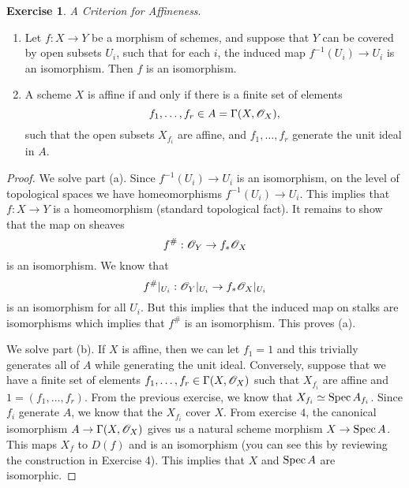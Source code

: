 \documentclass[]{pcmi}
\theoremstyle{plain}
\theoremstyle{definition}
\newtheorem{Exercise}[subsubsection]{Exercise}
\theoremstyle{remark}
\begin{document}
\begin{Exercise}\label{Exercise:2.2.17}
    \emph{A Criterion for Affineness}.
    \begin{enumerate}[label = (\alph*)]
        \item Let $f : X \to Y$ be a morphism of schemes, and suppose that $Y$ can be covered by open subsets $U_i$, such that for each $i$, the induced map $f^{-1}(U_i) \to U_i$ is an isomorphism. Then $f$ is an isomorphism. 
        \item A scheme $X$ is affine if and only if there is a finite set of elements 
        \[
            f_1, \ldots, f_r \in A = \Gamma(X, \mathscr{O}_X),
        \] 
        such that the open subsets $X_{f_i}$ are affine, and $f_1, \ldots, f_r$ generate the unit ideal in $A$. 
    \end{enumerate}
\end{Exercise}

\begin{proof}
    We solve part (a). Since $f^{-1}(U_i) \to U_i$ is an isomorphism, on the level of topological spaces we have homeomorphisms $f^{-1}(U_i) \to U_i$. This implies that $f : X \to Y$ is a homeomorphism (standard topological fact). It remains to show that the map on sheaves 
    \[
        f^{\#} : \mathscr{O}_Y \to f_* \mathscr{O}_X
    \]
    is an isomorphism. We know that 
    \[
        f^{\#}|_{U_i} : \mathscr{O}_Y|_{U_i} \to f_* \mathscr{O}_X |_{U_i}
    \]
    is an isomorphism for all $U_i$. But this implies that the induced map on stalks are isomorphisms which implies that $f^{\#}$ is an isomorphism. This proves (a). 

    We solve part (b). If $X$ is affine, then we can let $f_1 = 1$ and this trivially generates all of $A$ while generating the unit ideal. Conversely, suppose that we have a finite set of elements $f_1, \ldots, f_r \in \Gamma(X, \mathscr{O}_X)$ such that $X_{f_i}$ are affine and $1 = (f_1, \ldots, f_r)$. From the previous exercise, we know that $X_{f_i} \simeq \operatorname{Spec} A_{f_i}$. Since $f_i$ generate $A$, we know that the $X_{f_i}$ cover $X$. From exercise $4$, the canonical isomorphism $A \to \Gamma(X, \mathscr{O}_X)$ gives us a natural scheme morphism $X \to \operatorname{Spec} A$. This maps $X_f$ to $D(f)$ and is an isomorphism (you can see this by reviewing the construction in Exercise 4). This implies that $X$ and $\operatorname{Spec} A$ are isomorphic. 
\end{proof}
\end{document}
